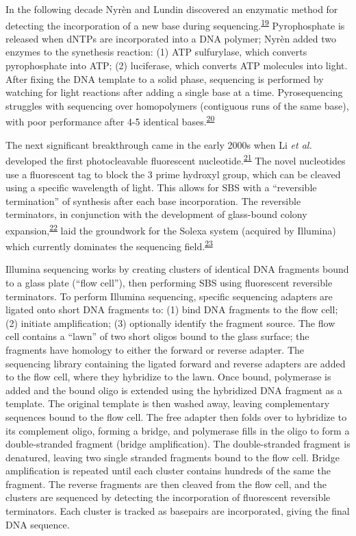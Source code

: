 \documentclass[11pt,letterpaper]{book}
\begin{document}
In the following decade Nyrèn and Lundin discovered an enzymatic method for detecting the incorporation of a new base during sequencing.\textsuperscript{\protect\hyperlink{ref-nyren:1985aa}{19}}
Pyrophosphate is released when dNTPs are incorporated into a DNA polymer; Nyrèn added two enzymes to the synethesis reaction: (1) ATP sulfurylase, which converts pyrophosphate into ATP; (2) luciferase, which converts ATP molecules into light.
After fixing the DNA template to a solid phase, sequencing is performed by watching for light reactions after adding a single base at a time.
Pyrosequencing struggles with sequencing over homopolymers (contiguous runs of the same base), with poor performance after 4-5 identical bases.\textsuperscript{\protect\hyperlink{ref-ronaghi:1998aa}{20}}

The next significant breakthrough came in the early 2000s when Li \emph{et al.} developed the first photocleavable fluorescent nucleotide.\textsuperscript{\protect\hyperlink{ref-li:2003aa}{21}}
The novel nucleotides use a fluorescent tag to block the 3 prime hydroxyl group, which can be cleaved using a specific wavelength of light.
This allows for SBS with a ``reversible termination'' of synthesis after each base incorporation.
The reversible terminators, in conjunction with the development of glass-bound colony expansion,\textsuperscript{\protect\hyperlink{ref-fedurco:2006aa}{22}} laid the groundwork for the Solexa system (acquired by Illumina) which currently dominates the sequencing field.\textsuperscript{\protect\hyperlink{ref-turcatti:2008aa}{23}}

Illumina sequencing works by creating clusters of identical DNA fragments bound to a glass plate (``flow cell''), then performing SBS using fluorescent reversible terminators.
To perform Illumina sequencing, specific sequencing adapters are ligated onto short DNA fragments to: (1) bind DNA fragments to the flow cell; (2) initiate amplification; (3) optionally identify the fragment source.
The flow cell contains a ``lawn'' of two short oligos bound to the glass surface; the fragments have homology to either the forward or reverse adapter.
The sequencing library containing the ligated forward and reverse adapters are added to the flow cell, where they hybridize to the lawn.
Once bound, polymerase is added and the bound oligo is extended using the hybridized DNA fragment as a template.
The original template is then washed away, leaving complementary sequences bound to the flow cell.
The free adapter then folds over to hybridize to its complement oligo, forming a bridge, and polymerase fills in the oligo to form a double-stranded fragment (bridge amplification).
The double-stranded fragment is denatured, leaving two single stranded fragments bound to the flow cell.
Bridge amplification is repeated until each cluster contains hundreds of the same the fragment.
The reverse fragments are then cleaved from the flow cell, and the clusters are sequenced by detecting the incorporation of fluorescent reversible terminators.
Each cluster is tracked as basepairs are incorporated, giving the final DNA sequence.
\end{document}
